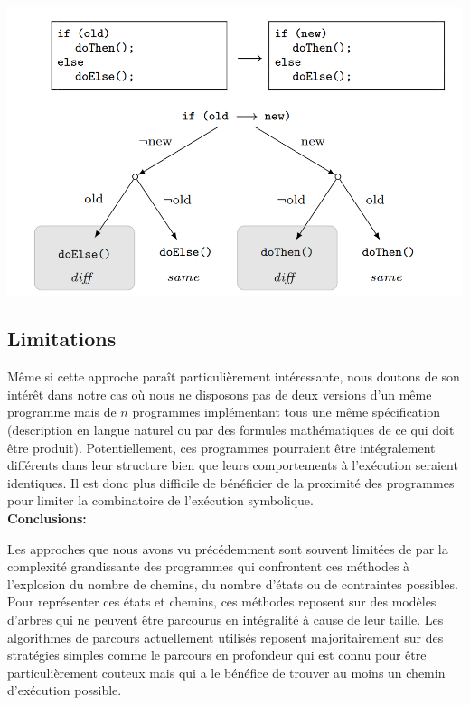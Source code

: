 \begin{center}
    \includegraphics[scale=0.45]{../ressources/images/shadow_example.png}
    \label{shadow-example}
\end{center}


\subsection{Limitations}

Même si cette approche paraît particulièrement intéressante, nous doutons de son intérêt dans notre cas où nous ne disposons pas de deux versions d'un même programme mais de $n$ programmes implémentant tous une même spécification (description en langue naturel ou par des formules mathématiques de ce qui doit être produit).
Potentiellement, ces programmes pourraient être intégralement différents dans leur structure bien que leurs comportements à l'exécution seraient identiques. Il est donc plus difficile de bénéficier de la proximité des programmes pour limiter la combinatoire de l'exécution symbolique.\\

{\setlength{\parindent}{0cm}\textbf{Conclusions:}}

Les approches que nous avons vu précédemment sont souvent limitées\cite{test-auto-solved-yet} de par la complexité grandissante des programmes qui confrontent ces méthodes à l'explosion du nombre de chemins, du nombre d'états ou de contraintes possibles. Pour représenter ces états et chemins, ces méthodes reposent sur des modèles d'arbres qui ne peuvent être parcourus en intégralité à cause de leur taille. Les algorithmes de parcours actuellement utilisés reposent majoritairement sur des stratégies simples comme le parcours en profondeur qui est connu pour être particulièrement couteux mais qui a le bénéfice de trouver au moins un chemin d'exécution possible.

